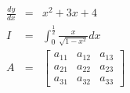 \documentclass{jarticle}
\begin{document}
    \begin{eqnarray*}
     \frac{dy}{dx} &=& x^2 + 3x + 4\\
     I &=& \int_{0}^{\frac{1}{2}} \frac{x}{\sqrt{1-x^2}}  dx\\
     A &=& \begin{bmatrix}
        a_{11} & a_{12} & a_{13}\\
        a_{21} & a_{22} & a_{23}\\
        a_{31} & a_{32} & a_{33}
     \end{bmatrix}  
    \end{eqnarray*}




   
      
\end{document}
